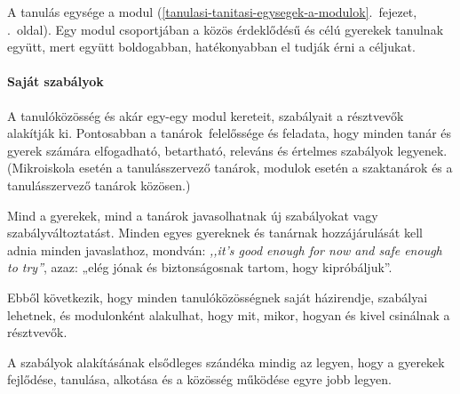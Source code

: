 A tanulás egysége a
modul (\ref{tanulasi-tanitasi-egysegek-a-modulok}.~fejezet, \pageref{tanulasi-tanitasi-egysegek-a-modulok}.~oldal).
Egy modul csoportjában a közös érdeklődésű és célú gyerekek tanulnak
együtt, mert együtt boldogabban, hatékonyabban el tudják érni a
céljukat.

\hypertarget{sajat-szabalyok}{%
\paragraph{Saját szabályok}\label{sajat-szabalyok}}

A tanulóközösség és akár egy-egy modul kereteit, szabályait a résztvevők
alakítják ki. Pontosabban a tanárok~felelőssége és feladata, hogy minden
tanár és gyerek számára elfogadható, betartható, releváns és értelmes
szabályok legyenek. (Mikroiskola esetén a tanulásszervező tanárok,
modulok esetén a szaktanárok és a tanulásszervező tanárok közösen.)

Mind a gyerekek, mind a tanárok javasolhatnak új szabályokat vagy
szabályváltoztatást. Minden egyes gyereknek és tanárnak hozzájárulását
kell adnia minden javaslathoz, mondván: \emph{,,it's good enough for
now and safe enough to try''}, azaz: „elég jónak és biztonságosnak
tartom, hogy kipróbáljuk''.

Ebből következik, hogy minden tanulóközösségnek saját házirendje,
szabályai lehetnek, és modulonként alakulhat, hogy mit, mikor, hogyan és
kivel csinálnak a résztvevők.

A szabályok alakításának elsődleges szándéka mindig az legyen, hogy a
gyerekek fejlődése, tanulása, alkotása és a közösség működése egyre jobb
legyen.

